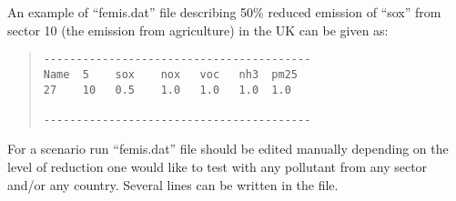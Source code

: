 An example of ``femis.dat'' file describing 50\% reduced emission of
``sox'' from sector 10 (the emission from agriculture) in the UK can be given as:  
\begin{quote}
\begin{verbatim}
-----------------------------------------
Name  5    sox    nox   voc   nh3  pm25 
27    10   0.5    1.0   1.0   1.0  1.0   

-----------------------------------------
\end{verbatim}        
\end{quote}
For a scenario run ``femis.dat'' file should be edited 
manually depending on the level of
reduction one would like to test with any pollutant from any sector
and/or any country. Several lines can be written in the file.
